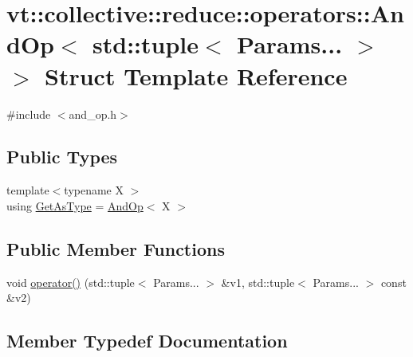 \hypertarget{structvt_1_1collective_1_1reduce_1_1operators_1_1_and_op_3_01std_1_1tuple_3_01_params_8_8_8_01_4_01_4}{}\section{vt\+:\+:collective\+:\+:reduce\+:\+:operators\+:\+:And\+Op$<$ std\+:\+:tuple$<$ Params... $>$ $>$ Struct Template Reference}
\label{structvt_1_1collective_1_1reduce_1_1operators_1_1_and_op_3_01std_1_1tuple_3_01_params_8_8_8_01_4_01_4}


{\ttfamily \#include $<$and\+\_\+op.\+h$>$}

\subsection*{Public Types}
\begin{DoxyCompactItemize}
\item 
{\footnotesize template$<$typename X $>$ }\\using \hyperlink{structvt_1_1collective_1_1reduce_1_1operators_1_1_and_op_3_01std_1_1tuple_3_01_params_8_8_8_01_4_01_4_a0f8d55e9537d1fa1d81d8aa2d232a4af}{Get\+As\+Type} = \hyperlink{structvt_1_1collective_1_1reduce_1_1operators_1_1_and_op}{And\+Op}$<$ X $>$
\end{DoxyCompactItemize}
\subsection*{Public Member Functions}
\begin{DoxyCompactItemize}
\item 
void \hyperlink{structvt_1_1collective_1_1reduce_1_1operators_1_1_and_op_3_01std_1_1tuple_3_01_params_8_8_8_01_4_01_4_a5ec08ad20d1897c9bec0cace68106258}{operator()} (std\+::tuple$<$ Params... $>$ \&v1, std\+::tuple$<$ Params... $>$ const \&v2)
\end{DoxyCompactItemize}


\subsection{Member Typedef Documentation}
\mbox{\label{structvt_1_1collective_1_1reduce_1_1operators_1_1_and_op_3_01std_1_1tuple_3_01_params_8_8_8_01_4_01_4_a0f8d55e9537d1fa1d81d8aa2d232a4af}} 
